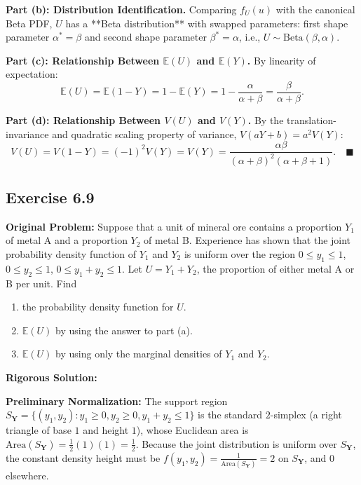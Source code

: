 \documentclass[11pt, letterpaper]{article}
\theoremstyle{definition}
\theoremstyle{remark}
\newcommand{\E}{\mathbb{E}}
\begin{document}
\textbf{Part (b): Distribution Identification.}
Comparing $f_U(u)$ with the canonical Beta PDF, $U$ has a **Beta distribution** with swapped parameters: first shape parameter $\alpha^* = \beta$ and second shape parameter $\beta^* = \alpha$, i.e., $U \sim \text{Beta}(\beta, \alpha)$.

\textbf{Part (c): Relationship Between $\E(U)$ and $\E(Y)$.}
By linearity of expectation:
\[
    \E(U) = \E(1 - Y) = 1 - \E(Y) = 1 - \frac{\alpha}{\alpha + \beta} = \frac{\beta}{\alpha + \beta}.
\]

\textbf{Part (d): Relationship Between $V(U)$ and $V(Y)$.}
By the translation-invariance and quadratic scaling property of variance, $V(aY + b) = a^2 V(Y)$:
\[
    V(U) = V(1 - Y) = (-1)^2 V(Y) = V(Y) = \frac{\alpha\beta}{(\alpha + \beta)^2(\alpha + \beta + 1)}. \quad \blacksquare
\]

\subsection{Exercise 6.9}

\textbf{Original Problem:}
Suppose that a unit of mineral ore contains a proportion $Y_1$ of metal A and a proportion $Y_2$ of metal B. Experience has shown that the joint probability density function of $Y_1$ and $Y_2$ is uniform over the region $0 \le y_1 \le 1$, $0 \le y_2 \le 1$, $0 \le y_1 + y_2 \le 1$. Let $U = Y_1 + Y_2$, the proportion of either metal A or B per unit. Find
\begin{enumerate}[label=\textbf{\alph*}]
    \item the probability density function for $U$.
    \item $\E(U)$ by using the answer to part (a).
    \item $\E(U)$ by using only the marginal densities of $Y_1$ and $Y_2$.
\end{enumerate}

\hrulefill

\textbf{Rigorous Solution:}

\textbf{Preliminary Normalization:} The support region $S_{\mathbf{Y}} = \{(y_1, y_2) : y_1 \ge 0, y_2 \ge 0, y_1 + y_2 \le 1\}$ is the standard $2$-simplex (a right triangle of base $1$ and height $1$), whose Euclidean area is $\text{Area}(S_{\mathbf{Y}}) = \frac{1}{2}(1)(1) = \frac{1}{2}$. Because the joint distribution is uniform over $S_{\mathbf{Y}}$, the constant density height must be $f(y_1, y_2) = \frac{1}{\text{Area}(S_{\mathbf{Y}})} = 2$ on $S_{\mathbf{Y}}$, and $0$ elsewhere.
\end{document}
